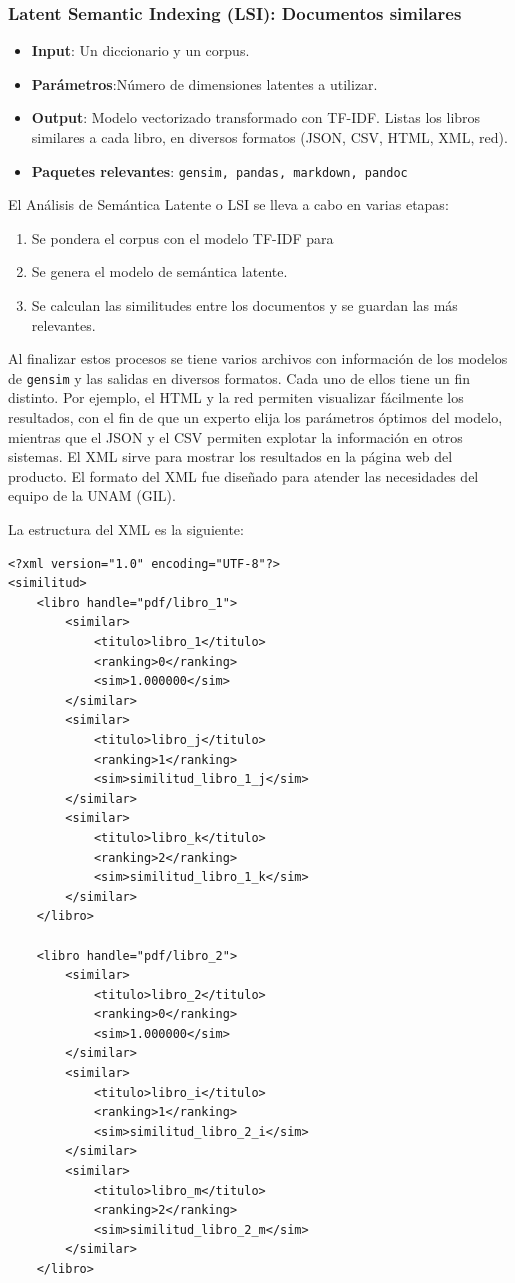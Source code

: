 \subsubsection{ Latent Semantic Indexing (LSI): Documentos similares}

\begin{itemize}
\item \textbf{Input}: Un diccionario y un corpus.

\item \textbf{Parámetros}:Número de dimensiones latentes a utilizar.

\item \textbf{Output}: Modelo vectorizado transformado con TF-IDF. Listas los libros similares a cada libro, en diversos formatos (JSON, CSV, HTML, XML, red).

\item \textbf{Paquetes relevantes}: \texttt{gensim, pandas, markdown, pandoc}
\end{itemize}

El Análisis de Semántica Latente o LSI se lleva a cabo en varias etapas:
\begin{enumerate}

\item Se pondera el corpus con el modelo TF-IDF para \item  Se genera el modelo de semántica latente.
\item  Se calculan las similitudes entre los documentos y se guardan las más relevantes.

\end{enumerate}

Al finalizar estos procesos se tiene varios archivos con información de los modelos de  \texttt{gensim} y las salidas en diversos formatos. Cada uno de ellos tiene un fin distinto. Por ejemplo, el HTML y la red permiten visualizar fácilmente los resultados, con el fin de que un experto elija los parámetros óptimos del modelo, mientras que el JSON y el CSV permiten explotar la información en otros sistemas. El XML sirve para mostrar los resultados en la página web del producto. El formato del XML fue diseñado para atender las necesidades del equipo de la UNAM (GIL).

La estructura del XML es la siguiente:

\begin{lstlisting}
<?xml version="1.0" encoding="UTF-8"?>
<similitud>
	<libro handle="pdf/libro_1">
		<similar>
			<titulo>libro_1</titulo>
			<ranking>0</ranking>
			<sim>1.000000</sim>
		</similar>
		<similar>
			<titulo>libro_j</titulo>
			<ranking>1</ranking>
			<sim>similitud_libro_1_j</sim>
		</similar>
		<similar>
			<titulo>libro_k</titulo>
			<ranking>2</ranking>
			<sim>similitud_libro_1_k</sim>
		</similar>
	</libro>
	
	<libro handle="pdf/libro_2">
		<similar>
			<titulo>libro_2</titulo>
			<ranking>0</ranking>
			<sim>1.000000</sim>
		</similar>
		<similar>
			<titulo>libro_i</titulo>
			<ranking>1</ranking>
			<sim>similitud_libro_2_i</sim>
		</similar>
		<similar>
			<titulo>libro_m</titulo>
			<ranking>2</ranking>
			<sim>similitud_libro_2_m</sim>
		</similar>
	</libro>
\end{lstlisting}

